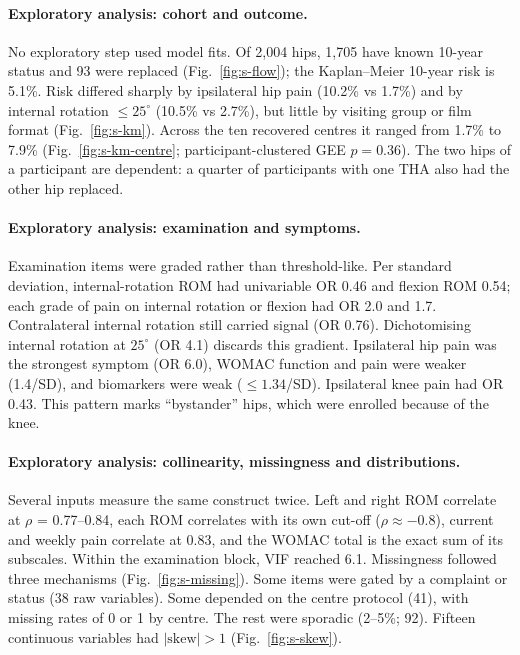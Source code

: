 \paragraph{Exploratory analysis: cohort and outcome.}
No exploratory step used model fits. Of 2,004 hips, 1,705 have known 10-year status and 93 were replaced
(Fig.~\ref{fig:s-flow}); the Kaplan--Meier 10-year risk is 5.1\%. Risk differed sharply by ipsilateral hip pain (10.2\%
vs 1.7\%) and by internal rotation $\le25^\circ$ (10.5\% vs 2.7\%), but little by visiting group or film format
(Fig.~\ref{fig:s-km}). Across the ten recovered centres it ranged from 1.7\% to 7.9\% (Fig.~\ref{fig:s-km-centre};
participant-clustered GEE $p=0.36$). The two hips of a participant are dependent: a quarter of participants with one
THA also had the other hip replaced.

\paragraph{Exploratory analysis: examination and symptoms.}
Examination items were graded rather than threshold-like. Per standard deviation, internal-rotation ROM had univariable
OR 0.46 and flexion ROM 0.54; each grade of pain on internal rotation or flexion had OR 2.0 and 1.7. Contralateral
internal rotation still carried signal (OR 0.76). Dichotomising internal rotation at $25^\circ$ (OR 4.1) discards this
gradient. Ipsilateral hip pain was the strongest symptom (OR 6.0), WOMAC function and pain were weaker (1.4/SD), and
biomarkers were weak ($\le1.34$/SD). Ipsilateral knee pain had OR 0.43. This pattern marks ``bystander'' hips, which
were enrolled because of the knee.

\paragraph{Exploratory analysis: collinearity, missingness and distributions.}
Several inputs measure the same construct twice. Left and right ROM correlate at $\rho$ = 0.77--0.84, each ROM correlates
with its own cut-off ($\rho\approx-0.8$), current and weekly pain correlate at 0.83, and the WOMAC total is the exact sum
of its subscales. Within the examination block, VIF reached 6.1. Missingness followed three mechanisms
(Fig.~\ref{fig:s-missing}). Some items were gated by a complaint or status (38 raw variables). Some depended on the
centre protocol (41), with missing rates of 0 or 1 by centre. The rest were sporadic (2--5\%; 92). Fifteen continuous
variables had $|\text{skew}|>1$ (Fig.~\ref{fig:s-skew}).


